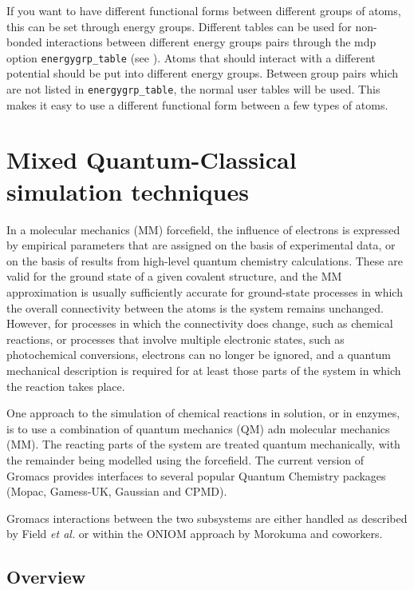 If you want to have different functional forms between different
groups of atoms, this can be set through energy groups.
Different tables can be used for non-bonded interactions between
different energy groups pairs through the mdp option {\tt energygrp\_table}
(see ).
Atoms that should interact with a different potential should
be put into different energy groups.
Between group pairs which are not listed in {\tt energygrp\_table},
the normal user tables will be used. This makes it easy to use
a different functional form between a few types of atoms.

\section{Mixed Quantum-Classical simulation techniques}

In a molecular mechanics (MM) forcefield, the influence of electrons
is expressed by empirical parameters that are assigned on the basis of
experimental data, or on the basis of results from high-level quantum
chemistry calculations. These are valid for the ground state of a
given covalent structure, and the MM approximation is usually
sufficiently accurate for ground-state processes in which the overall
connectivity between the atoms is the system remains
unchanged. However, for processes in which the connectivity does
change, such as chemical reactions, or processes that involve multiple
electronic states, such as photochemical conversions, electrons can no
longer be ignored, and a quantum mechanical description is required
for at least those parts of the system in which the reaction takes
place.

One approach to the simulation of chemical reactions in solution, or
in enzymes, is to use a combination of quantum mechanics (QM) adn
molecular mechanics (MM). The reacting parts of the system are treated
quantum mechanically, with the remainder being modelled using the
forcefield. The current version of Gromacs provides interfaces to
several popular Quantum Chemistry packages (Mopac\cite{mopac},
Gamess-UK\cite{gamess-uk}, Gaussian\cite{g03} and CPMD\cite{Car85a}).

Gromacs interactions between the two subsystems are
either handled as described by Field {\it{et al.}}\cite{Field90a} or
within the ONIOM approach by Morokuma and coworkers\cite{Maseras96a,
Svensson96a}.

\subsection{Overview}

